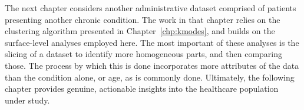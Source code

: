 The next chapter considers another administrative dataset comprised of patients
presenting another chronic condition. The work in that chapter relies on the
clustering algorithm presented in Chapter~\ref{chp:kmodes}, and builds on the
surface-level analyses employed here. The most important of these analyses is
the slicing of a dataset to identify more homogeneous parts, and then comparing
those. The process by which this is done incorporates more attributes of the
data than the condition alone, or age, as is commonly done. Ultimately, the
following chapter provides genuine, actionable insights into the healthcare
population under study.
